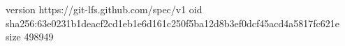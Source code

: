 version https://git-lfs.github.com/spec/v1
oid sha256:63e0231b1deacf2cd1eb1e6d161c250f5ba12d8b3ef0dcf45acd4a5817fc621e
size 498949
